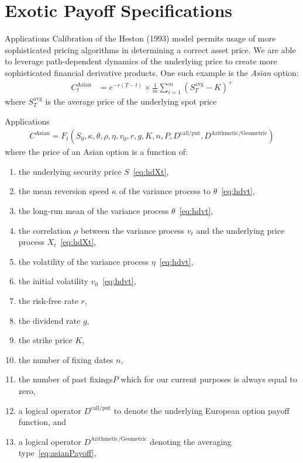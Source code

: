 \documentclass[aspectratio=169,xcolor=dvipsnames]{beamer}
\begin{document}
	\section{Exotic Payoff Specifications}
	
		\begin{frame}{Applications}
		Calibration of the Heston (1993) model permits usage of more sophisticated pricing algorithms in determining a correct asset price. We are able to leverage path-dependent dynamics of the underlying price to create more sophisticated financial derivative products. One such example is the \textit{Asian} option:
			\begin{align}
				\label{eq:asianPayoff}
				C^{\text{Asian}}_t &= e^{-r(T-t)} \times \frac{1}{m} \sum_{i=1}^{m} (S_{T}^{\text{avg}} - K)^{+}
			\end{align}
			where $S_{T}^{\text{avg}}$ is the average price of the underlying spot price
		\end{frame}
		
		\begin{frame}{Applications}
			\begin{align}
				C^{\text{Asian}} = F_{t}(S_0, \kappa, \theta, \rho, \eta, v_{0}, r, g, K, n, P, D^{\text{call/put}}, D^{\text{Arithmetic/Geometric}}) \label{eq:Casian}
			\end{align}
			where the price of an Asian option is a function of:
			\begin{enumerate}
				\small
				\item the underlying security price $S$~\eqref{eq:hdXt}, 
				\item the mean reversion speed $\kappa$ of the variance process to $\theta$~\eqref{eq:hdvt}, 
				\item the long-run mean of the variance process $\theta$~\eqref{eq:hdvt}, 
				\item the correlation $\rho$ between the variance process $v_t$ and the underlying price process $X_t$~\eqref{eq:hdXt}, 
				\item the volatility of the variance process $\eta$~\eqref{eq:hdvt}, 
				\item the initial volatility $v_{0}$~\eqref{eq:hdvt}, 
				\item the risk-free rate $r$, 
				\item the dividend rate $g$, 
				\item the strike price $K$, 
				\item the number of fixing dates $n$, 
				\item the number of past fixings$P$ which for our current purposes is always equal to zero, 
				\item a logical operator $D^{\text{call/put}}$ to denote the underlying European option payoff function, and
				\item a logical operator $D^{\text{Arithmetic/Geometric}}$ denoting the averaging type~\eqref{eq:asianPayoff},
			\end{enumerate}
		\end{frame}
		
\end{document}
